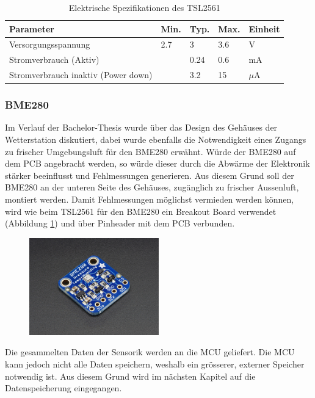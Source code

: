 \begin{table}[h]
  \centering
  \caption{Elektrische Spezifikationen des TSL2561 \cite{TSL2561}}
    \begin{tabular}{lllll}
    \toprule
    \textbf{Parameter} & \textbf{Min.} & \textbf{Typ.} & \textbf{Max.} & \textbf{Einheit} \\
    \midrule
    Versorgungsspannung & 2.7  & 3   & 3.6   & V \\
    Stromverbrauch (Aktiv) &       & 0.24   & 0.6   & mA \\
    Stromverbrauch inaktiv (Power down) &       & 3.2   & 15 & $\mu$A \\
    \bottomrule
    \end{tabular}%
  \label{tab:TSL2561}%
\end{table}%
\newpage
\subsubsection{BME280}
Im Verlauf der Bachelor-Thesis wurde über das Design des Gehäuses der Wetterstation diskutiert, dabei wurde ebenfalls die Notwendigkeit eines Zugangs zu frischer Umgebungsluft für den BME280 erwähnt. Würde der BME280 auf dem PCB angebracht werden, so würde dieser durch die Abwärme der Elektronik stärker beeinflusst und Fehlmessungen generieren. Aus diesem Grund soll der BME280 an der unteren Seite des Gehäuses, zugänglich zu frischer Aussenluft, montiert werden. Damit Fehlmessungen möglichst vermieden werden können, wird wie beim TSL2561 für den BME280 ein Breakout Board verwendet (Abbildung \ref{fig:BME_Breakout}) und über Pinheader mit dem PCB verbunden.\\

\begin{figure}[hbtp]
\centering
\includegraphics[width=0.5\textwidth]{graphics/BME280/BME280_Breakout.JPG}
\label{fig:BME_Breakout}
\end{figure}

Die gesammelten Daten der Sensorik werden an die MCU geliefert. Die MCU kann jedoch nicht alle Daten speichern, weshalb ein grösserer, externer Speicher notwendig ist. Aus diesem Grund wird im nächsten Kapitel auf die Datenspeicherung eingegangen.